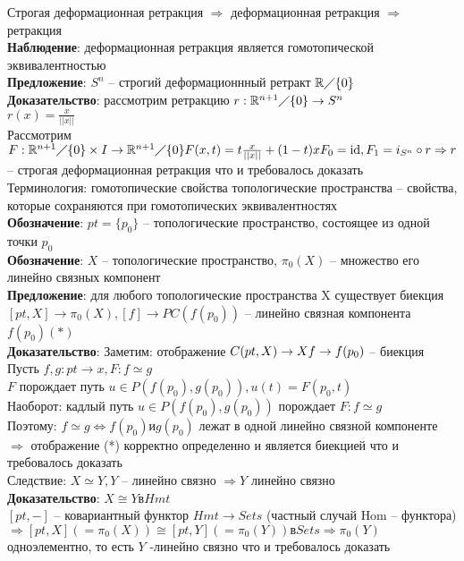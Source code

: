 	Строгая деформационная ретракция $\Rightarrow$ деформационная ретракция $\Rightarrow$ ретракция\\
	\textbf{Наблюдение}: деформационная ретракция является гомотопической эквивалентностью\\
	\textbf{Предложение}: $S^n$ -- строгий деформационнный ретракт $\mathbb{R} \diagup \{0\}$\\
	\textbf{Доказательство}: рассмотрим ретракцию $r: \mathbb{R}^{n+1} \diagup \{0\} \rightarrow S^n$\\
	$r(x) = \frac{x}{||x||}$\\
	Рассмотрим $F: \mathbb{R}^{n+1} \diagup \{0\} \times I \rightarrow \mathbb{R}^{n+1} \diagup \{0\}\\
	F(x,t) = t \frac{x}{||x||} + (1-t)x\\
	F_0 =  \text{id}, F_1 = i_{S^n} \circ r \Rightarrow r$ -- строгая деформационная ретракция что и требовалось доказать\\
	Терминология: гомотопические свойства топологические пространства -- свойства, которые сохраняются при гомотопических эквивалентностях\\
	\textbf{Обозначение}: $pt = \{p_0\}$ -- топологические пространство, состоящее из одной точки $p_0$\\
	\textbf{Обозначение}: $X$ -- топологические пространство, ${\pi}_0 (X)$ -- множество его линейно связных компонент\\
	\textbf{Предложение}: для любого топологические пространства X существует биекция $[pt,X] \rightarrow {\pi}_0 (X), [f] \rightarrow PC (f(p_0))$ -- линейно связная компонента $f(p_0) (*)$\\
	\textbf{Доказательство}: Заметим: отображение $C(pt, X) \rightarrow X\\
	f\rightarrow f(p_0)$ -- биекция\\
	Пусть $f,g: pt \rightarrow x, F: f\simeq g$\\
	$F$ порождает путь $u\in P(f(p_0), g(p_0)), u(t) = F(p_0, t)$\\
	Наоборот: кадлый путь $u\in P(f(p_0), g(p_0))$ порождает $F: f\simeq g$\\
	Поэтому: $f\simeq g \Leftrightarrow f(p_0) и g(p_0)$ лежат в одной линейно связной компоненте $\Rightarrow$ отображение (*) корректно определенно и является биекцией что и требовалось доказать\\
	Следствие: $X\simeq Y, Y$ -- линейно связно $\Rightarrow Y$ линейно связно\\
	\textbf{Доказательство}: $X \cong Y в Hmt$\\
	$[pt, -]$ -- ковариантный функтор $Hmt \rightarrow Sets$ (частный случай $\text{Hom}$ -- функтора) $\Rightarrow [pt, X]( = {\pi}_0 (X)) \cong [pt,Y] ( = {\pi}_0 (Y)) в Sets \Rightarrow {\pi}_0 (Y)$ одноэлементно, то есть $Y$ -линейно связно что и требовалось доказать
	


